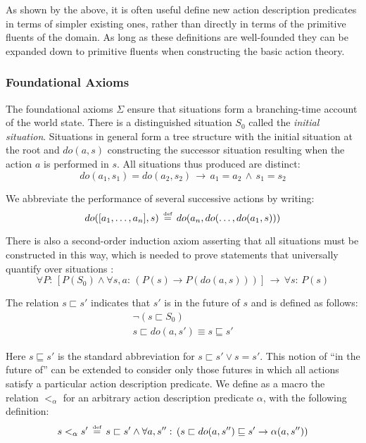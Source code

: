 As shown by the above, it is often useful define new action description
predicates in terms of simpler existing ones, rather than directly
in terms of the primitive fluents of the domain. As long as these
definitions are well-founded they can be expanded down to primitive
fluents when constructing the basic action theory.


\subsubsection{Foundational Axioms}

The foundational axioms $\Sigma$ ensure that situations form a branching-time
account of the world state. There is a distinguished situation $S_{0}$
called the \emph{initial situation}. Situations in general form a
tree structure with the initial situation at the root and $do(a,s)$
constructing the successor situation resulting when the action $a$
is performed in $s$. All situations thus produced are distinct:\[
do(a_{1},s_{1})=do(a_{2},s_{2})\,\rightarrow\, a_{1}=a_{2}\,\wedge\, s_{1}=s_{2}\]


We abbreviate the performance of several successive actions by writing:\[
do([a_{1},\dots,a_{n}],s)\,\stackrel{\mbox{\tiny def}}{=}\, do(a_{n},do(\dots,do(a_{1},s)))\]


There is also a second-order induction axiom asserting that all situations
must be constructed in this way, which is needed to prove statements
that universally quantify over situations \citep{Reiter93proving}:\[
\forall P:\,\left[P(S_{0})\wedge\forall s,a:\,\left(P(s)\rightarrow P(do(a,s))\right)\right]\,\rightarrow\,\forall s:\, P(s)\]


The relation $s\sqsubset s'$ indicates that $s'$ is in the future
of $s$ and is defined as follows:\begin{gather*}
\neg(s\sqsubset S_{0})\\
s\sqsubset do(a,s')\equiv s\sqsubseteq s'\end{gather*}


Here $s\sqsubseteq s'$ is the standard abbreviation for $s\sqsubset s'\vee s=s'$.
This notion of {}``in the future of'' can be extended to consider
only those futures in which all actions satisfy a particular action
description predicate. We define as a macro the relation $<_{\alpha}$
for an arbitrary action description predicate $\alpha$, with the
following definition:\[
s<_{\alpha}s'\,\stackrel{\mbox{\tiny def}}{=}\, s\sqsubset s'\wedge\forall a,s'':\,\left(s\sqsubset do(a,s'')\sqsubseteq s'\rightarrow\alpha(a,s'')\right)\]


